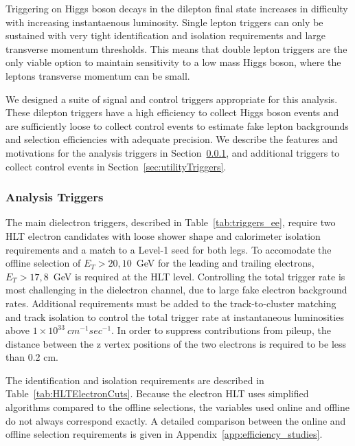 Triggering on Higgs boson decays in the dilepton final state increases 
in difficulty with increasing instantaenous luminosity.
Single lepton triggers can only be sustained with very tight identification and
isolation requirements and large transverse momentum thresholds.
This means that double lepton triggers are the only viable option to maintain
sensitivity to a low mass Higgs boson, where the leptons transverse momentum
can be small.

We designed a suite of signal and control triggers appropriate for this analysis.
These dilepton triggers have a high efficiency to collect Higgs boson events
and are sufficiently loose to collect control events to estimate
fake lepton backgrounds and selection efficiencies with adequate precision.
We describe the features and motivations for the analysis triggers in Section~\ref{sec:mainTriggers},
and additional triggers to collect control events in 
Section~\ref{sec:utilityTriggers}.

\subsubsection{Analysis Triggers}
\label{sec:mainTriggers}

The main dielectron triggers, described in Table~\ref{tab:triggers_ee}, 
require two HLT electron candidates with loose shower shape and calorimeter isolation requirements 
and a match to a Level-1 seed for both legs. 
To accomodate the offline selection of $E_{T}>20,10$~GeV for the leading and trailing
electrons, $E_{T}>17,8$~GeV is required at the HLT level.
Controlling the total trigger rate is most challenging in
the dielectron channel, due to large fake electron background rates.
Additional requirements must be added to the track-to-cluster matching
and track isolation to control the total trigger rate at 
instantaneous luminosities above $1\times10^{33}~cm^{-1}sec^{-1}$.
In order to suppress contributions from pileup, the distance between the z vertex positions 
of the two electrons is required to be less than 0.2 cm.

The identification and isolation requirements are described in Table~\ref{tab:HLTElectronCuts}.
Because the electron HLT uses simplified algorithms compared to the offline selections,
the variables used online and offline do not always correspond exactly.
A detailed comparison between the online and offline selection requirements is given in
Appendix~\ref{app:efficiency_studies}.


